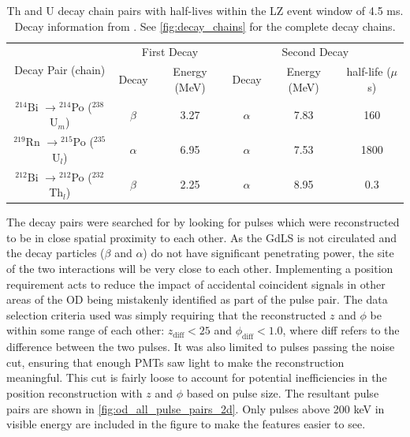 \begin{table}[]
    \centering
    \begin{tabular}{c|c|c|c|c|c}
        \multirow{2}{*}{Decay Pair (chain)}                    & \multicolumn{2}{c|}{First Decay}   & \multicolumn{3}{c}{Second Decay}    \\ 
                                                               & Decay    & Energy (MeV) & Decay    & Energy (MeV) & half-life ($\mu$s) \\ \hline
        ${}^{214}$Bi $\to {}^{214}$Po (${}^{238}$U$_{m}$)          & $\beta$  & 3.27         & $\alpha$ & 7.83         & 160   \\ 
        ${}^{219}$Rn $\to {}^{215}$Po (${}^{235}$U$_{l}$)          & $\alpha$ & 6.95         & $\alpha$ & 7.53         & 1800  \\ 
        ${}^{212}$Bi $\to {}^{212}$Po (${}^{232}$Th$_{l}$)         & $\beta$  & 2.25         & $\alpha$ & 8.95         & 0.3
    \end{tabular}
    \caption{Th and U decay chain pairs with half-lives within the LZ event window of 4.5 ms. 
             Decay information from \cite{radon_chains_ref}.
             See \autoref{fig:decay_chains} for the complete decay chains.}
    \label{tab:od_constrainable_decays_in_data}
\end{table}

\par
The decay pairs were searched for by looking for pulses which were reconstructed to be in close spatial proximity to each other.
As the GdLS is not circulated and the decay particles ($\beta$ and $\alpha$) do not have significant penetrating power, the site of the two interactions will be very close to each other.
Implementing a position requirement acts to reduce the impact of accidental coincident signals in other areas of the OD being mistakenly identified as part of the pulse pair.
The data selection criteria used was simply requiring that the reconstructed $z$ and $\phi$ be within some range of each other: $z_{\text{diff}} < 25$ and $\phi_{\text{diff}} < 1.0$, where diff refers to the difference between the two pulses.
It was also limited to pulses passing the noise cut, ensuring that enough PMTs saw light to make the reconstruction meaningful.
This cut is fairly loose to account for potential inefficiencies in the position reconstruction with $z$ and $\phi$ based on pulse size.
The resultant pulse pairs are shown in \autoref{fig:od_all_pulse_pairs_2d}.
Only pulses above 200 keV in visible energy are included in the figure to make the features easier to see.

